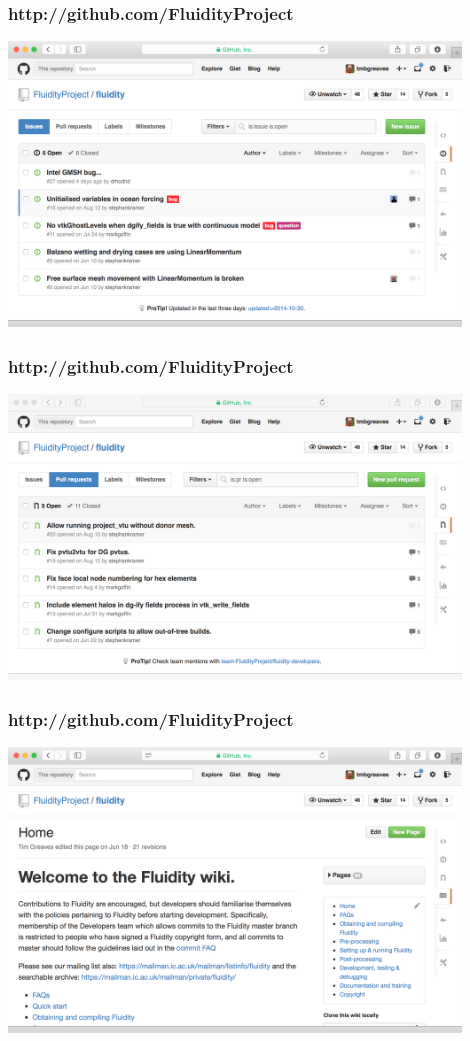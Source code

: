 \documentclass[12pt]{beamer}
\begin{document}
\begin{frame}
        \frametitle{http://github.com/FluidityProject}
\begin{center}
    \includegraphics[width=0.9\textwidth]{images/github-issues.png}
\end{center}
\end{frame}

\begin{frame}
        \frametitle{http://github.com/FluidityProject}
\begin{center}
    \includegraphics[width=0.9\textwidth]{images/github-pullrequests.png}
\end{center}
\end{frame}

\begin{frame}
        \frametitle{http://github.com/FluidityProject}
\begin{center}
    \includegraphics[width=0.9\textwidth]{images/github-wiki.png}
\end{center}
\end{frame}
\end{document}
